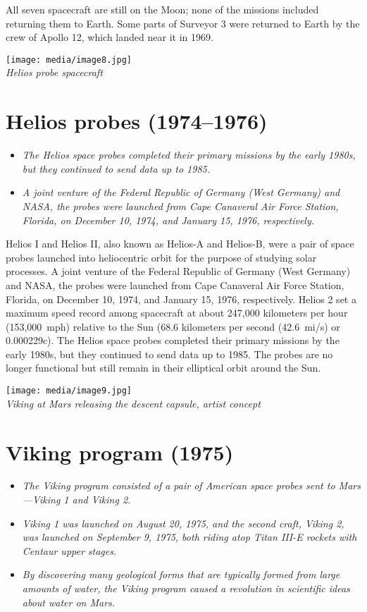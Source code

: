 All seven spacecraft are still on the Moon; none of the missions
included returning them to Earth. Some parts of Surveyor 3 were returned
to Earth by the crew of Apollo 12, which landed near it in 1969.

\texttt{[image: media/image8.jpg]}\\
\emph{Helios probe spacecraft}

\section{Helios probes (1974--1976)}\label{helios-probes-19741976}

\begin{itemize}
\item
  \emph{The Helios space probes completed their primary missions by the
  early 1980s, but they continued to send data up to 1985.}
\item
  \emph{A joint venture of the Federal Republic of Germany (West
  Germany) and NASA, the probes were launched from Cape Canaveral Air
  Force Station, Florida, on December 10, 1974, and January 15, 1976,
  respectively.}
\end{itemize}

Helios I and Helios II, also known as Helios-A and Helios-B, were a pair
of space probes launched into heliocentric orbit for the purpose of
studying solar processes. A joint venture of the Federal Republic of
Germany (West Germany) and NASA, the probes were launched from Cape
Canaveral Air Force Station, Florida, on December 10, 1974, and January
15, 1976, respectively. Helios 2 set a maximum speed record among
spacecraft at about 247,000 kilometers per hour (153,000~mph) relative
to the Sun (68.6 kilometers per second (42.6~mi/s) or 0.000229c). The
Helios space probes completed their primary missions by the early 1980s,
but they continued to send data up to 1985. The probes are no longer
functional but still remain in their elliptical orbit around the Sun.

\texttt{[image: media/image9.jpg]}\\
\emph{Viking at Mars releasing the descent capsule, artist concept}

\section{Viking program (1975)}\label{viking-program-1975}

\begin{itemize}
\item
  \emph{The Viking program consisted of a pair of American space probes
  sent to Mars---Viking 1 and Viking 2.}
\item
  \emph{Viking 1 was launched on August 20, 1975, and the second craft,
  Viking 2, was launched on September 9, 1975, both riding atop Titan
  III-E rockets with Centaur upper stages.}
\item
  \emph{By discovering many geological forms that are typically formed
  from large amounts of water, the Viking program caused a revolution in
  scientific ideas about water on Mars.}
\end{itemize}

